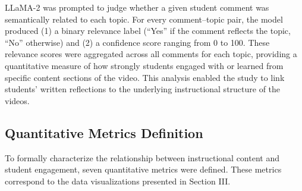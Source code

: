 LLaMA-2 was prompted to judge whether a given student comment was semantically related to each topic. For every comment–topic pair, the model produced (1) a binary relevance label (“Yes” if the comment reflects the topic, “No” otherwise) and (2) a confidence score ranging from 0 to 100. These relevance scores were aggregated across all comments for each topic, providing a quantitative measure of how strongly students engaged with or learned from specific content sections of the video. This analysis enabled the study to link students’ written reflections to the underlying instructional structure of the videos.

\subsection{Quantitative Metrics Definition}

To formally characterize the relationship between instructional content and student engagement, seven quantitative metrics were defined. These metrics correspond to the data visualizations presented in Section III.

